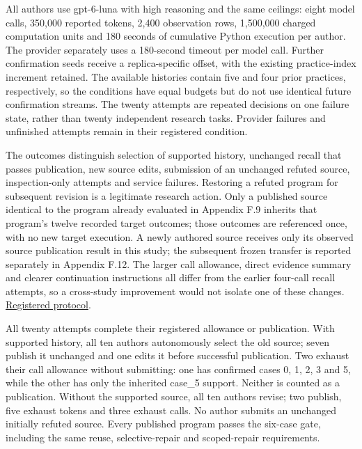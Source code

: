 \documentclass[twoside,11pt]{article}
\begin{document}
All authors use gpt-6-luna with high reasoning and the same ceilings: eight model
calls, 350,000 reported tokens, 2,400 observation rows, 1,500,000 charged
computation units and 180 seconds of cumulative Python execution per author.
The provider separately uses a 180-second timeout per model call. Further confirmation seeds
receive a replica-specific offset, with the existing practice-index increment
retained. The available histories contain five and four prior practices,
respectively, so the conditions have equal budgets but do not use identical
future confirmation streams. The twenty attempts are repeated decisions on one
failure state, rather than twenty independent research tasks. Provider failures
and unfinished attempts remain in their registered condition.


The outcomes distinguish selection of supported history, unchanged recall that
passes publication, new source edits, submission of an unchanged refuted source,
inspection-only attempts and service failures. Restoring a refuted program for
subsequent revision is a legitimate research action. Only a published source
identical to the program already evaluated in Appendix F.9 inherits that program's
twelve recorded target outcomes; those outcomes are referenced once, with no new
target execution. A newly authored source receives only its observed source
publication result in this study; the subsequent frozen transfer is reported
separately in Appendix F.12. The larger call allowance, direct evidence
summary and clearer continuation instructions all differ from the earlier
four-call recall attempts, so a cross-study improvement would not isolate one
of these changes.
\hyperlink{artifact-97}{Registered protocol}.


All twenty attempts complete their registered allowance or publication. With
supported history, all ten authors autonomously select the old source; seven
publish it unchanged and one edits it before successful publication. Two exhaust
their call allowance without submitting: one has confirmed cases 0, 1, 2, 3 and 5,
while the other has only the inherited case\_5 support. Neither is counted as a
publication. Without the supported source, all ten authors revise; two publish,
five exhaust tokens and three exhaust calls. No author submits an unchanged
initially refuted source. Every published program passes the six-case gate,
including the same reuse, selective-repair and scoped-repair requirements.
\end{document}
